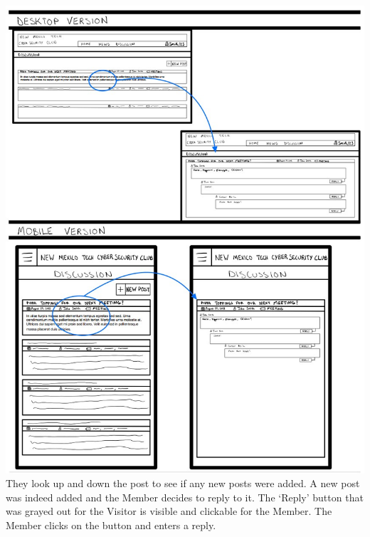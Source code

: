 \documentclass{article}
\begin{document}
\includegraphics[scale=0.60]{member_4.jpg} They look up and down the post to see if any new posts were added.  A new post was indeed added and the Member decides to reply to it.  The ‘Reply’ button that was grayed out for the Visitor is visible and clickable for the Member.  The Member clicks on the button and enters a reply.  
\par
\end{document}
